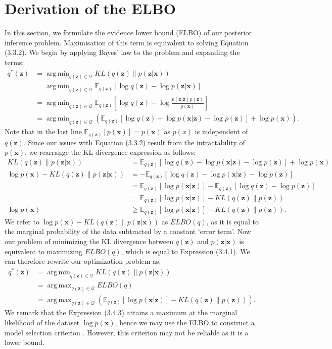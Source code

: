 \documentclass[honours,12pt]{unswthesis}
\DeclareMathOperator*{\argmin}{arg\,min}
\DeclareMathOperator*{\argmax}{arg\,max}
\numberwithin{equation}{section}
\theoremstyle{definition}
\begin{document}
\section{Derivation of the ELBO}\label{sec:3.4}
In this section, we formulate the evidence lower bound (ELBO) of our posterior inference problem. Maximisation of this term is equivalent to solving Equation (3.3.2). We begin by applying Bayes' law to the problem and expanding the terms:
\begin{align*}
q^*(\bm{z})&=\argmin_{q(\bm{z})\in \mathcal{Q}}KL(q(\bm{z})\|p(\bm{z}|\bm{x}))\\
&= \argmin_{q(\bm{z})\in \mathcal{Q}} \mathbb{E}_{q(\bm{z})}[\log q(\bm{z})-\log p(\bm{z}|\bm{x})]\\
&= \argmin_{q(\bm{z})\in \mathcal{Q}} \mathbb{E}_{q(\bm{z})}\left[\log q(\bm{z})-\log\frac{p(\bm{x}|\bm{z})p(\bm{z})}{p(\bm{x})}\right]\\
&= \argmin_{q(\bm{z})\in \mathcal{Q}} \left(\mathbb{E}_{q(\bm{z})}[\log q(\bm{z})-\log p(\bm{x}|\bm{z})-\log p(\bm{z})]+\log p(\bm{x})\right).
\end{align*}
Note that in the last line $\mathbb{E}_{q(\bm{z})}[p(\bm{x})]=p(\bm{x})$ as $p(x)$ is independent of $q(\bm{z})$. Since our issues with Equation (3.3.2) result from the intractability of $p(\bm{x})$, we rearrange the KL divergence expression as follows:
\begin{align}
KL(q(\bm{z})\|p(\bm{z}|\bm{x}))&=\mathbb{E}_{q(\bm{z})}[\log q(\bm{z})-\log p(\bm{x}|\bm{z})-\log p(\bm{z})]+\log p(\bm{x}) \nonumber \\
\log p(\bm{x})-KL(q(\bm{z})\|p(\bm{z}|\bm{x}))&=-\mathbb{E}_{q(\bm{z})}[\log q(\bm{z})-\log p(\bm{x}|\bm{z})-\log p(\bm{z})]\nonumber \\
&=\mathbb{E}_{q(\bm{z})}[\log p(\bm{x}|\bm{z})]-\mathbb{E}_{q(\bm{z})}[\log q(\bm{z})-\log p(\bm{z})]\nonumber \\
&=\mathbb{E}_{q(\bm{z})}[\log p(\bm{x}|\bm{z})]-KL(q(\bm{z})\|p(\bm{z}))\\
\log p(\bm{x})&\geq \mathbb{E}_{q(\bm{z})}[\log p(\bm{x}|\bm{z})]-KL(q(\bm{z})\|p(\bm{z})).
\end{align}
We refer to $\log p(\bm{x})-KL(q(\bm{z})\|p(\bm{z}|\bm{x}))$ as $ELBO(q)$, as it is equal to the marginal probability of the data subtracted by a constant `error term'. Now our problem of minimizing the KL divergence between $q(\bm{z})$ and $p(\bm{z}|\bm{x})$ is equivalent to maximizing $ELBO(q)$, which is equal to Expression (3.4.1). We can therefore rewrite our optimization problem as:
\begin{align}
q^*(\bm{z})&=\argmin_{q(\bm{z})\in \mathcal{Q}}KL(q(\bm{z})\|p(\bm{z}|\textbf{x}))\nonumber\\
&= \argmax_{q(\bm{z})\in \mathcal{Q}} ELBO(q)\nonumber\\
&= \argmax_{q(\bm{z})\in \mathcal{Q}} \left(\mathbb{E}_{q(\bm{z})}[\log p(\bm{x}|\bm{z})]-KL(q(\bm{z})\|p(\bm{z}))\right).
\end{align}
We remark that the Expression (3.4.3) attains a maximum at the marginal likelihood of the dataset $\log p(\bm{x})$, hence we may use the ELBO to construct a model selection criterion \citep{pattern}. However, this criterion may not be reliable as it is a lower bound.
\newpage
\end{document}
